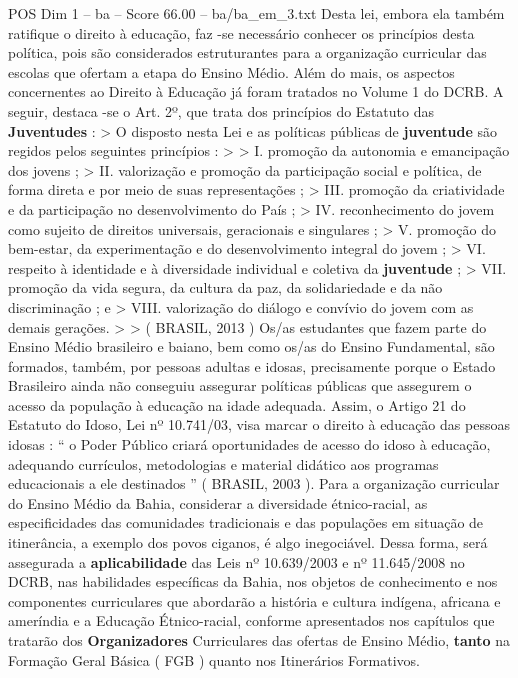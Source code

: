 \begin{textsample}{POS Dim 1 – ba – Score 66.00 – ba/ba\_em\_3.txt}
Desta lei, embora ela também ratifique o direito à educação, faz -se necessário conhecer os princípios desta política, pois são considerados estruturantes para a organização curricular das escolas que ofertam a etapa do Ensino Médio.
Além do mais, os aspectos concernentes ao Direito à Educação já foram tratados no Volume 1 do DCRB.
A seguir, destaca -se o Art. 2º, que trata dos princípios do Estatuto das \textbf{Juventudes} : > O disposto nesta Lei e as políticas públicas de \textbf{juventude} são regidos pelos seguintes princípios : > > I. promoção da autonomia e emancipação dos jovens ; > II. valorização e promoção da participação social e política, de forma direta e por meio de suas representações ; > III. promoção da criatividade e da participação no desenvolvimento do País ; > IV. reconhecimento do jovem como sujeito de direitos universais, geracionais e singulares ; > V. promoção do bem-estar, da experimentação e do desenvolvimento integral do jovem ; > VI. respeito à identidade e à diversidade individual e coletiva da \textbf{juventude} ; > VII. promoção da vida segura, da cultura da paz, da solidariedade e da não discriminação ; e > VIII. valorização do diálogo e convívio do jovem com as demais gerações. > > ( BRASIL, 2013 ) Os/as estudantes que fazem parte do Ensino Médio brasileiro e baiano, bem como os/as do Ensino Fundamental, são formados, também, por pessoas adultas e idosas, precisamente porque o Estado Brasileiro ainda não conseguiu assegurar políticas públicas que assegurem o acesso da população à educação na idade adequada.
Assim, o Artigo 21 do Estatuto do Idoso, Lei nº 10.741/03, visa marcar o direito à educação das pessoas idosas : “ o Poder Público criará oportunidades de acesso do idoso à educação, adequando currículos, metodologias e material didático aos programas educacionais a ele destinados ” ( BRASIL, 2003 ).
Para a organização curricular do Ensino Médio da Bahia, considerar a diversidade étnico-racial, as especificidades das comunidades tradicionais e das populações em situação de itinerância, a exemplo dos povos ciganos, é algo inegociável.
Dessa forma, será assegurada a \textbf{aplicabilidade} das Leis nº 10.639/2003 e nº 11.645/2008 no DCRB, nas habilidades específicas da Bahia, nos objetos de conhecimento e nos componentes curriculares que abordarão a história e cultura indígena, africana e ameríndia e a Educação Étnico-racial, conforme apresentados nos capítulos que tratarão dos \textbf{Organizadores} Curriculares das ofertas de Ensino Médio, \textbf{tanto} na Formação Geral Básica ( FGB ) quanto nos Itinerários Formativos.

\end{textsample}

